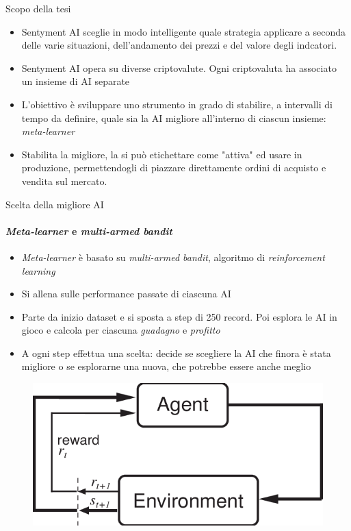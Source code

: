 \documentclass{beamer}
\begin{document}
\begin{frame}{Scopo della tesi}
\begin{itemize}
\item Sentyment AI sceglie in modo intelligente quale strategia applicare a seconda delle varie situazioni,
dell'andamento dei prezzi e del valore degli indcatori.
\item Sentyment AI opera su diverse criptovalute. Ogni criptovaluta ha associato un insieme di AI separate
\item L'obiettivo è sviluppare uno strumento in grado di stabilire, a intervalli di tempo da definire,
quale sia la AI migliore all'interno di ciascun insieme: \textit{meta-learner}
\item Stabilita la migliore, la si può etichettare come "attiva" ed usare in produzione, permettendogli di piazzare direttamente ordini di acquisto e vendita sul mercato.
\end{itemize}
\end{frame}

\begin{frame}{Scelta della migliore AI}
\framesubtitle{\textit{Meta-learner} e \textit{multi-armed bandit}}
\begin{itemize}
\item \textit{Meta-learner} è basato su \textit{multi-armed bandit}, algoritmo di \textit{reinforcement learning}
\item Si allena sulle performance passate di ciascuna AI
\item Parte da inizio dataset e si sposta a step di 250 record. Poi esplora le AI in gioco e calcola per ciascuna \textit{guadagno} e \textit{profitto}
\item A ogni step effettua una scelta: decide se scegliere la AI che finora è stata migliore o se esplorarne una nuova, che potrebbe essere anche meglio
\end{itemize}
\begin{figure}
        \centering
        \includegraphics[width=.45\linewidth]{rl}
    \end{figure}
\end{frame}
\end{document}
